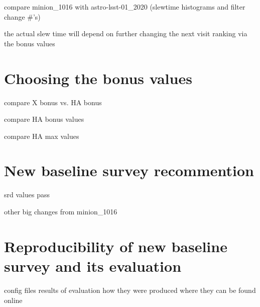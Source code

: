 \documentclass[DM,lsstdraft,authoryear,toc]{lsstdoc}
\begin{document}
compare minion\_1016 with astro-lsst-01\_2020 (slewtime histograms and filter change #'s)

the actual slew time will depend on further changing the next visit ranking via the bonus values

\section{Choosing the bonus values} 

compare X bonus vs. HA bonus

compare HA bonus values
 
compare HA max values

\section{New baseline survey recommention}

srd values pass

other big changes from minion\_1016

\section{Reproducibility of new baseline survey and its evaluation}

config files
results of evaluation
how they were produced
where they can be found online


\end{document}
